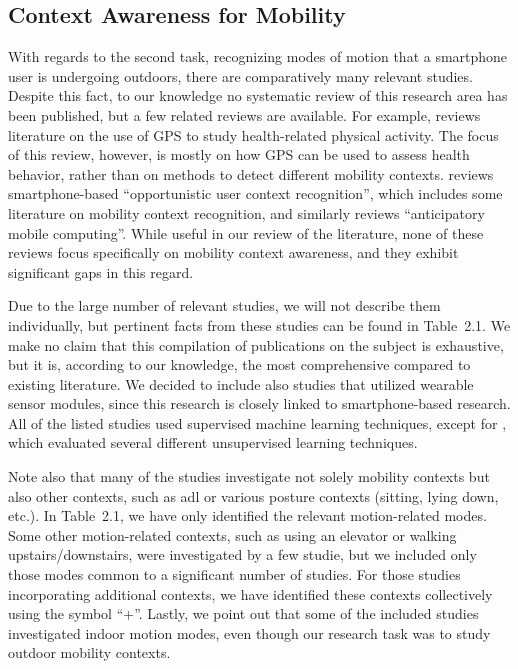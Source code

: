 \subsection{Context Awareness for Mobility}
\label{sec:mobility-context-literature}

With regards to the second task, recognizing modes of motion that a smartphone user is undergoing outdoors, there are comparatively many relevant studies. Despite this fact, to our knowledge no systematic review of this research area has been published, but a few related reviews are available. For example, \cite{Duncan2009} reviews literature on the use of GPS to study health-related physical activity. The focus of this review, however, is mostly on how GPS can be used to assess health behavior, rather than on methods to detect different mobility contexts.  \cite{hoseini2013survey} reviews smartphone-based ``opportunistic user context recognition'', which includes some literature on mobility context recognition, and similarly \cite{pejovic2015anticipatory} reviews ``anticipatory mobile computing''. While useful in our review of the literature, none of these reviews focus specifically on mobility context awareness, and they exhibit significant gaps in this regard.

Due to the large number of relevant studies, we will not describe them individually, but pertinent facts from these studies can be found in Table~2.1. We make no claim that this compilation of publications on the subject is exhaustive, but it is, according to our knowledge, the most comprehensive compared to existing literature. We decided to include also studies that utilized wearable sensor modules, since this research is closely linked to smartphone-based research. All of the listed studies used supervised machine learning techniques, except for \cite{kwon2014unsupervised}, which evaluated several different unsupervised learning techniques.

Note also that many of the studies investigate not solely mobility contexts but also other contexts, such as \gls{adl} or various posture contexts (sitting, lying down, etc.). In Table~2.1, we have only identified the relevant motion-related modes. Some other motion-related contexts, such as using an elevator or walking upstairs/downstairs, were investigated by a few studie, but we included only those modes common to a significant number of studies. For those studies incorporating additional contexts, we have identified these contexts collectively using the symbol ``+''. Lastly, we point out that some of the included studies investigated indoor motion modes, even though our research task was to study outdoor mobility contexts. 


